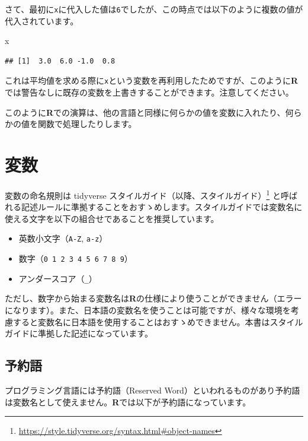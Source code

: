 \documentclass[
  12pt,
]{book}
\newenvironment{Shaded}{\begin{snugshade}}{\end{snugshade}}
\newcommand{\NormalTok}[1]{#1}
\DeclareRobustCommand{\href}[2]{#2\footnote{\url{#1}}}
\providecommand{\tightlist}{%
  \setlength{\itemsep}{0pt}\setlength{\parskip}{0pt}}
\begin{document}
さて、最初に\texttt{x}に代入した値は\texttt{6}でしたが、この時点では以下のように複数の値が代入されています。

\begin{Shaded}
\begin{Highlighting}[]
\NormalTok{x}
\end{Highlighting}
\end{Shaded}

\begin{verbatim}
## [1]  3.0  6.0 -1.0  0.8
\end{verbatim}

これは平均値を求める際に\texttt{x}という変数を再利用したためですが、このように\textbf{R}では警告なしに既存の変数を上書きすることができます。注意してください。

このように\textbf{R}での演算は、他の言語と同様に何らかの値を変数に入れたり、何らかの値を関数で処理したりします。

\hypertarget{ux5909ux6570}{%
\section{変数}\label{ux5909ux6570}}

変数の命名規則は \href{https://style.tidyverse.org/syntax.html\#object-names}{tidyverse スタイルガイド（以降、スタイルガイド）} と呼ばれる記述ルールに準拠することをおすゝめします。スタイルガイドでは変数名に使える文字を以下の組合せであることを推奨しています。

\begin{itemize}
\tightlist
\item
  英数小文字（\texttt{A-Z}, \texttt{a-z}）
\item
  数字（\texttt{0\ 1\ 2\ 3\ 4\ 5\ 6\ 7\ 8\ 9}）
\item
  アンダースコア（\texttt{\_}）
\end{itemize}

ただし、数字から始まる変数名は\textbf{R}の仕様により使うことができません（エラーになります）。また、日本語の変数名を使うことは可能ですが、様々な環境を考慮すると変数名に日本語を使用することはおすゝめできません。本書はスタイルガイドに準拠した記述になっています。

\hypertarget{ux4e88ux7d04ux8a9e}{%
\subsection{予約語}\label{ux4e88ux7d04ux8a9e}}

プログラミング言語には予約語（Reserved Word）といわれるものがあり予約語は変数名として使えません。\textbf{R}では以下が予約語になっています。
\end{document}
